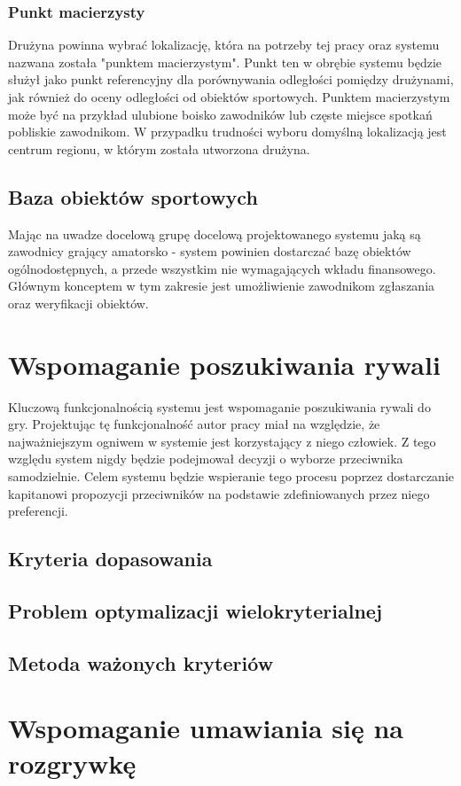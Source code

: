 \subsubsection{Punkt macierzysty}

Drużyna powinna wybrać lokalizację, która na potrzeby tej pracy oraz systemu nazwana została "punktem macierzystym". Punkt ten w obrębie systemu będzie służył jako punkt referencyjny dla porównywania odległości pomiędzy drużynami, jak również do oceny odległości od obiektów sportowych. Punktem macierzystym może być na przykład ulubione boisko zawodników lub częste miejsce spotkań pobliskie zawodnikom. W przypadku trudności wyboru domyślną lokalizacją jest centrum regionu, w którym została utworzona drużyna.

\subsection{Baza obiektów sportowych}

Mając na uwadze docelową grupę docelową projektowanego systemu jaką są zawodnicy grający amatorsko - system powinien dostarczać bazę obiektów ogólnodostępnych, a przede wszystkim nie wymagających wkładu finansowego. Głównym konceptem w tym zakresie jest umożliwienie zawodnikom zgłaszania oraz weryfikacji obiektów. 

\section{Wspomaganie poszukiwania rywali}

Kluczową funkcjonalnością systemu jest wspomaganie poszukiwania rywali do gry. Projektując tę funkcjonalność autor pracy miał na względzie, że najważniejszym ogniwem w systemie jest korzystający z niego człowiek. Z tego względu system nigdy będzie podejmował decyzji o wyborze przeciwnika samodzielnie. Celem systemu będzie wspieranie tego procesu poprzez dostarczanie kapitanowi propozycji przeciwników na podstawie zdefiniowanych przez niego preferencji.


\subsection{Kryteria dopasowania}

\subsection{Problem optymalizacji wielokryterialnej}

\subsection{Metoda ważonych kryteriów}

\section{Wspomaganie umawiania się na rozgrywkę}

